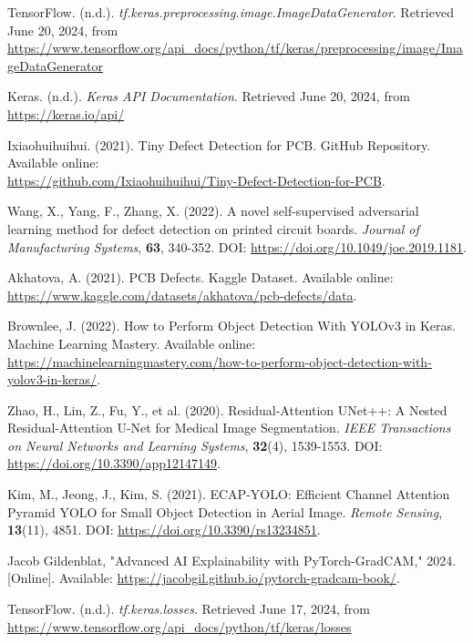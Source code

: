 \documentclass[12pt]{article}
\begin{document}
\begin{thebibliography}{10}
    TensorFlow. (n.d.). \textit{tf.keras.preprocessing.image.ImageDataGenerator}. Retrieved June 20, 2024, from \url{https://www.tensorflow.org/api_docs/python/tf/keras/preprocessing/image/ImageDataGenerator}

    Keras. (n.d.). \textit{Keras API Documentation}. Retrieved June 20, 2024, from \url{https://keras.io/api/}
    
    Ixiaohuihuihui. (2021). Tiny Defect Detection for PCB. GitHub Repository. Available online: \\\url{https://github.com/Ixiaohuihuihui/Tiny-Defect-Detection-for-PCB}.
    
    Wang, X., Yang, F., Zhang, X. (2022). A novel self-supervised adversarial learning method for defect detection on printed circuit boards. \textit{Journal of Manufacturing Systems}, \textbf{63}, 340-352. DOI: \url{https://doi.org/10.1049/joe.2019.1181}.
    
    Akhatova, A. (2021). PCB Defects. Kaggle Dataset. Available online: \url{https://www.kaggle.com/datasets/akhatova/pcb-defects/data}.
    
    Brownlee, J. (2022). How to Perform Object Detection With YOLOv3 in Keras. Machine Learning Mastery. Available online: \url{https://machinelearningmastery.com/how-to-perform-object-detection-with-yolov3-in-keras/}.
    
    Zhao, H., Lin, Z., Fu, Y., et al. (2020). Residual-Attention UNet++: A Nested Residual-Attention U-Net for Medical Image Segmentation. \textit{IEEE Transactions on Neural Networks and Learning Systems}, \textbf{32}(4), 1539-1553. DOI: \url{https://doi.org/10.3390/app12147149}.

    Kim, M., Jeong, J., Kim, S. (2021). ECAP-YOLO: Efficient Channel Attention Pyramid YOLO for Small Object Detection in Aerial Image. \textit{Remote Sensing}, \textbf{13}(11), 4851. DOI: \url{https://doi.org/10.3390/rs13234851}.

    Jacob Gildenblat, "Advanced AI Explainability with PyTorch-GradCAM," 2024. [Online]. Available: \url{https://jacobgil.github.io/pytorch-gradcam-book/}.

    TensorFlow. (n.d.). \textit{tf.keras.losses}. Retrieved June 17, 2024, from \url{https://www.tensorflow.org/api_docs/python/tf/keras/losses}

\end{thebibliography}

\clearpage
\newpage

\listoffigures

\clearpage
\newpage
\end{document}

